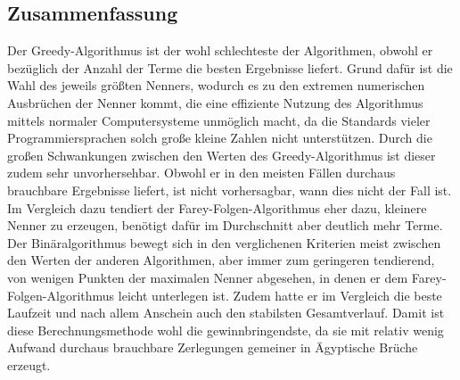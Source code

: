 \subsection{Zusammenfassung}
Der Greedy-Algorithmus ist der wohl schlechteste der Algorithmen, obwohl er bezüglich der Anzahl der Terme die besten Ergebnisse liefert. Grund dafür ist die Wahl des jeweils größten Nenners, wodurch es zu den extremen numerischen Ausbrüchen der Nenner kommt, die eine effiziente Nutzung des Algorithmus mittels normaler Computersysteme unmöglich macht, da die Standards vieler Programmiersprachen solch große \bzw kleine Zahlen nicht unterstützen. Durch die großen Schwankungen zwischen den Werten des Greedy-Algorithmus ist dieser zudem sehr unvorhersehbar. Obwohl er in den meisten Fällen durchaus brauchbare Ergebnisse liefert, ist nicht vorhersagbar, wann dies nicht der Fall ist. Im Vergleich dazu tendiert der Farey-Folgen-Algorithmus eher dazu, kleinere Nenner zu erzeugen, benötigt dafür im Durchschnitt aber deutlich mehr Terme. Der Binäralgorithmus bewegt sich in den verglichenen Kriterien meist zwischen den Werten der anderen Algorithmen, aber immer zum geringeren tendierend, von wenigen Punkten der maximalen Nenner abgesehen, in denen er dem Farey-Folgen-Algorithmus leicht unterlegen ist. Zudem hatte er im Vergleich die beste Laufzeit und nach allem Anschein auch den stabilsten Gesamtverlauf. Damit ist diese Berechnungsmethode wohl die gewinnbringendste, da sie mit relativ wenig Aufwand durchaus brauchbare Zerlegungen gemeiner in Ägyptische Brüche erzeugt.